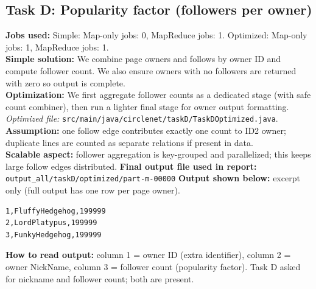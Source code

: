 \documentclass[11pt]{article}
\begin{document}
\subsection*{Task D: Popularity factor (followers per owner)}
\textbf{Jobs used:} Simple: Map-only jobs: 0, MapReduce jobs: 1. Optimized: Map-only jobs: 1, MapReduce jobs: 1.\\
\textbf{Simple solution:} We combine page owners and follows by owner ID and compute follower count. We also ensure owners with no followers are returned with zero so output is complete.\\
\textbf{Optimization:} We first aggregate follower counts as a dedicated stage (with safe count combiner), then run a lighter final stage for owner output formatting. \textit{Optimized file:} \texttt{src/main/java/circlenet/taskD/TaskDOptimized.java}.\\
\textbf{Assumption:} one follow edge contributes exactly one count to ID2 owner; duplicate lines are counted as separate relations if present in data.\\
\textbf{Scalable aspect:} follower aggregation is key-grouped and parallelized; this keeps large follow edges distributed.
\textbf{Final output file used in report:} \texttt{output\_all/taskD/optimized/part-m-00000}
\textbf{Output shown below:} excerpt only (full output has one row per page owner).
\begin{lstlisting}
1,FluffyHedgehog,199999
2,LordPlatypus,199999
3,FunkyHedgehog,199999
\end{lstlisting}
\textbf{How to read output:} column 1 = owner ID (extra identifier), column 2 = owner NickName, column 3 = follower count (popularity factor). Task D asked for nickname and follower count; both are present.
\end{document}
